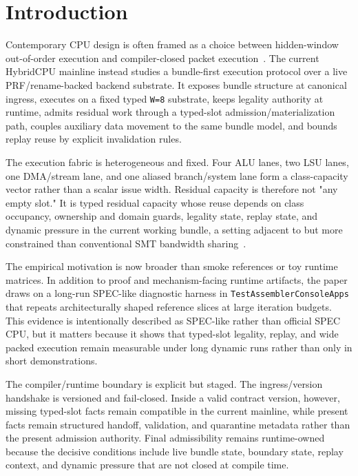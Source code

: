 \documentclass[twocolumn]{article}
\begin{document}
\section{Introduction}

Contemporary CPU design is often framed as a choice between hidden-window out-of-order execution and compiler-closed packet execution~\cite{tomasulo1967efficient,palacharla1997complexity,smith1995microarchitecture,fisher1983vliw,wall1991limits,schlansker2000epic}. The current HybridCPU mainline instead studies a bundle-first execution protocol over a live PRF/rename-backed backend substrate. It exposes bundle structure at canonical ingress, executes on a fixed typed \texttt{W=8} substrate, keeps legality authority at runtime, admits residual work through a typed-slot admission/materialization path, couples auxiliary data movement to the same bundle model, and bounds replay reuse by explicit invalidation rules.

The execution fabric is heterogeneous and fixed. Four ALU lanes, two LSU lanes, one DMA/stream lane, and one aliased branch/system lane form a class-capacity vector rather than a scalar issue width. Residual capacity is therefore not "any empty slot." It is typed residual capacity whose reuse depends on class occupancy, ownership and domain guards, legality state, replay state, and dynamic pressure in the current working bundle, a setting adjacent to but more constrained than conventional SMT bandwidth sharing~\cite{tullsen1995smt,kongetira2005niagara}.

The empirical motivation is now broader than smoke references or toy runtime matrices. In addition to proof and mechanism-facing runtime artifacts, the paper draws on a long-run SPEC-like diagnostic harness in \texttt{TestAssemblerConsoleApps} that repeats architecturally shaped reference slices at large iteration budgets. This evidence is intentionally described as SPEC-like rather than official SPEC CPU, but it matters because it shows that typed-slot legality, replay, and wide packed execution remain measurable under long dynamic runs rather than only in short demonstrations.

The compiler/runtime boundary is explicit but staged. The ingress/version handshake is versioned and fail-closed. Inside a valid contract version, however, missing typed-slot facts remain compatible in the current mainline, while present facts remain structured handoff, validation, and quarantine metadata rather than the present admission authority. Final admissibility remains runtime-owned because the decisive conditions include live bundle state, boundary state, replay context, and dynamic pressure that are not closed at compile time.
\end{document}
